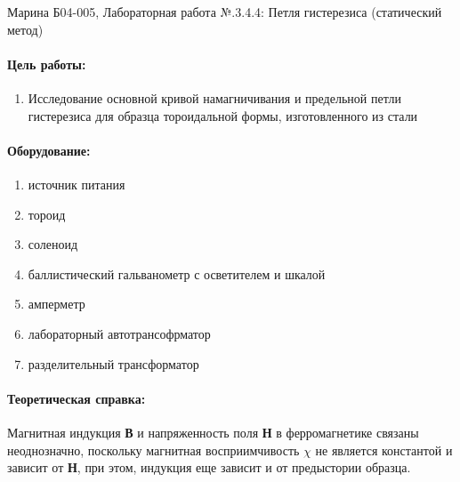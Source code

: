 \documentclass[a4paper,12pt]{article}
\author{Бичина Марина 
группа Б04-005 1 курса ФЭФМ}
\title{}
\date{}
\begin{document}

\begin{center}
\begin{Large}
{ Марина Б04-005, Лабораторная работа №.3.4.4: Петля гистерезиса (статический метод)}
\end{Large}
\end{center}
\paragraph{Цель работы:} 
\begin{enumerate}
\itemsep0em
\item Исследование основной кривой намагничивания и предельной петли гистерезиса для образца тороидальной формы, изготовленного из стали
\end{enumerate}
\paragraph{Оборудование:}
\begin{enumerate}
\itemsep0em
\item источник питания
\item тороид
\item соленоид
\item баллистический гальванометр с осветителем и шкалой 
\item амперметр
\item лабораторный автотрансофрматор
\item разделительный трансформатор 
\end{enumerate}

\paragraph{Теоретическая справка:}

Магнитная индукция \textbf{В} и напряженность поля \textbf{Н} в ферромагнетике связаны неоднозначно, поскольку магнитная восприимчивость $\chi$ не является константой и зависит от \textbf{Н}, при этом, индукция еще зависит и от предыстории образца. 
\end{document}
